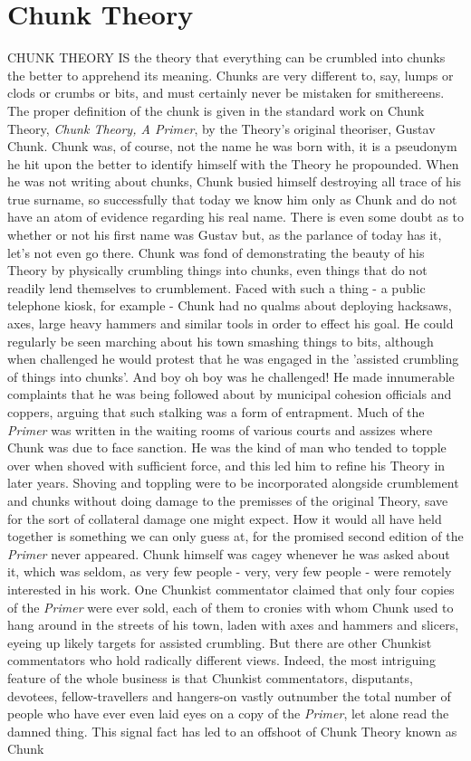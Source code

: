 \chapter{Chunk Theory}

CHUNK THEORY IS the theory that everything can be crumbled into chunks the better to apprehend its meaning. Chunks are very different to, say, lumps or clods or crumbs or bits, and must certainly never be mistaken for smithereens. The proper definition of the chunk is given in the standard work on Chunk Theory, \emph{Chunk Theory, A Primer}, by the Theory's original theoriser, Gustav Chunk. Chunk was, of course, not the name he was born with, it is a pseudonym he hit upon the better to identify himself with the Theory he propounded. When he was not writing about chunks, Chunk busied himself destroying all trace of his true surname, so successfully that today we know him only as Chunk and do not have an atom of evidence regarding his real name. There is even some doubt as to whether or not his first name was Gustav but, as the parlance of today has it, let's not even go there. Chunk was fond of demonstrating the beauty of his Theory by physically crumbling things into chunks, even things that do not readily lend themselves to crumblement. Faced with such a thing - a public telephone kiosk, for example - Chunk had no qualms about deploying hacksaws, axes, large heavy hammers and similar tools in order to effect his goal. He could regularly be seen marching about his town smashing things to bits, although when challenged he would protest that he was engaged in the 'assisted crumbling of things into chunks'. And boy oh boy was he challenged! He made innumerable complaints that he was being followed about by municipal cohesion officials and coppers, arguing that such stalking was a form of entrapment. Much of the \emph{Primer} was written in the waiting rooms of various courts and assizes where Chunk was due to face sanction. He was the kind of man who tended to topple over when shoved with sufficient force, and this led him to refine his Theory in later years. Shoving and toppling were to be incorporated alongside crumblement and chunks without doing damage to the premisses of the original Theory, save for the sort of collateral damage one might expect. How it would all have held together is something we can only guess at, for the promised second edition of the \emph{Primer} never appeared. Chunk himself was cagey whenever he was asked about it, which was seldom, as very few people - very, very few people - were remotely interested in his work. One Chunkist commentator claimed that only four copies of the \emph{Primer} were ever sold, each of them to cronies with whom Chunk used to hang around in the streets of his town, laden with axes and hammers and slicers, eyeing up likely targets for assisted crumbling. But there are other Chunkist commentators who hold radically different views. Indeed, the most intriguing feature of the whole business is that Chunkist commentators, disputants, devotees, fellow-travellers and hangers-on vastly outnumber the total number of people who have ever even laid eyes on a copy of the \emph{Primer}, let alone read the damned thing. This signal fact has led to an offshoot of Chunk Theory known as Chunk 